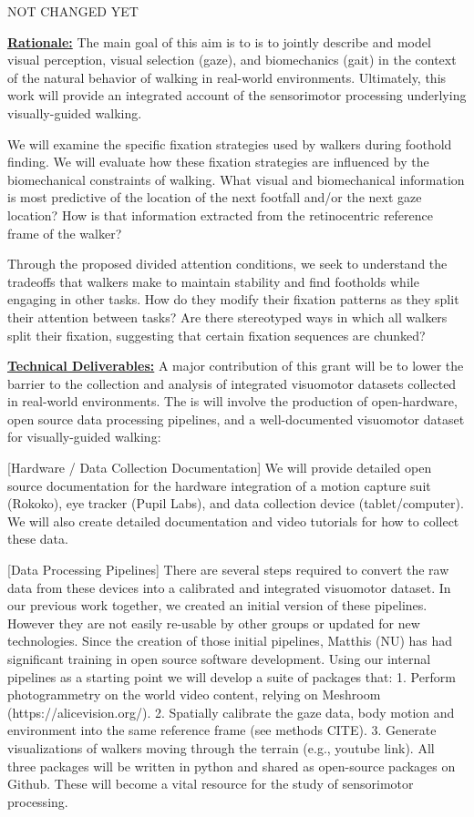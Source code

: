 
NOT CHANGED YET

\textbf{\underline{Rationale:}}  The main goal of this aim is to is to jointly describe and model visual perception, visual selection (gaze), and biomechanics (gait) in the context of the natural behavior of walking in real-world environments.  Ultimately, this work will provide an integrated account of the sensorimotor processing underlying visually-guided walking.

We will examine the specific fixation strategies used by walkers during foothold finding.  We will evaluate how these fixation strategies are influenced by the biomechanical constraints of walking. What visual and biomechanical information is most predictive of the location of the next footfall and/or the next gaze location?  How is that information extracted from the retinocentric reference frame of the walker?

Through the proposed divided attention conditions, we seek to understand the tradeoffs that walkers make to maintain stability and find footholds while engaging in other tasks.  How do they modify their fixation patterns as they split their attention between tasks?  Are there stereotyped ways in which all walkers split their fixation, suggesting that certain fixation sequences are chunked?

\noindent\underline{\textbf{Technical Deliverables:}} A major contribution of this grant will be to lower the barrier to the collection and analysis of integrated visuomotor datasets collected in real-world environments.  The is will involve the production of open-hardware, open source data processing pipelines, and a well-documented visuomotor dataset for visually-guided walking:

[Hardware / Data Collection Documentation] We will provide detailed open source documentation for the hardware integration of a motion capture suit (Rokoko), eye tracker (Pupil Labs), and data collection device (tablet/computer). We will also create detailed documentation and video tutorials for how to collect these data.

[Data Processing Pipelines] There are several steps required to convert the raw data from these devices into a calibrated and integrated visuomotor dataset. In our previous work together, we created an initial version of these pipelines. However they are not easily re-usable by other groups or updated for new technologies. Since the creation of those initial pipelines, Matthis (NU)
has had significant training in open source software development. Using our internal pipelines as a starting point we will develop a suite of packages that: 1. Perform photogrammetry on the world video content, relying on Meshroom (https://alicevision.org/). 2. Spatially calibrate the gaze data, body motion and environment into the same reference frame (see methods CITE). 3. Generate visualizations of walkers moving through the terrain (e.g., youtube link). All three packages will be written in
python and shared as open-source packages on Github.  These will become a vital resource for the study of sensorimotor processing.  

